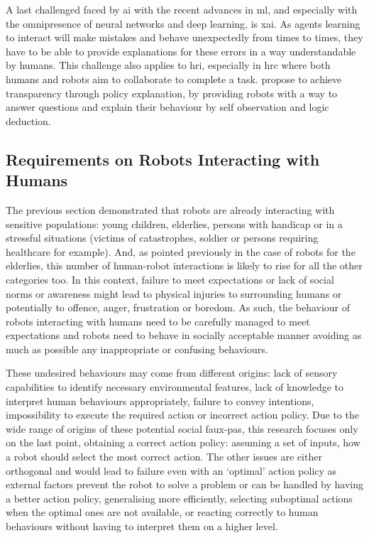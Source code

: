 	A last challenged faced by \gls{ai} with the recent advances in \gls{ml}, and especially with the omnipresence of neural networks and deep learning, is \gls{xai}. As agents learning to interact will make mistakes and behave unexpectedly from times to times, they have to be able to provide explanations for these errors in a way understandable by humans. This challenge also applies to \gls{hri}, especially in \gls{hrc} where both humans and robots aim to collaborate to complete a task. \cite{hayes2017improving} propose to achieve transparency through policy explanation, by providing robots with a way to answer questions and explain their behaviour by self observation and logic deduction.

\subsection{Requirements on Robots Interacting with Humans} \label{ssec:back_constraints}

    The previous section demonstrated that robots are already interacting with sensitive populations: young children, elderlies, persons with handicap or in a stressful situations (victims of catastrophes, soldier or persons requiring healthcare for example). And, as pointed previously in the case of robots for the elderlies, this number of human-robot interactions is likely to rise for all the other categories too. In this context, failure to meet expectations or lack of social norms or awareness might lead to physical injuries to surrounding humans or potentially to offence, anger, frustration or boredom. As such, the behaviour of robots interacting with humans need to be carefully managed to meet expectations and robots need to behave in socially acceptable manner avoiding as much as possible any inappropriate or confusing behaviours.
    
    These undesired behaviours may come from different origins: lack of sensory capabilities to identify necessary environmental features, lack of knowledge to interpret human behaviours appropriately, failure to convey intentions, impossibility to execute the required action or incorrect action policy. Due to the wide range of origins of these potential social faux-pas, this research focuses only on the last point, obtaining a correct action policy: assuming a set of inputs, how a robot should select the most correct action. The other issues are either orthogonal and would lead to failure even with an `optimal' action policy as external factors prevent the robot to solve a problem or can be handled by having a better action policy, generalising more efficiently, selecting suboptimal actions when the optimal ones are not available, or reacting correctly to human behaviours without having to interpret them on a higher level. 
    
